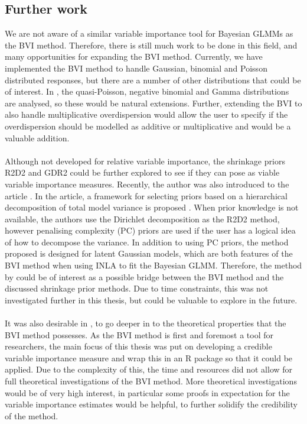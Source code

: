 \subsection*{Further work}
We are not aware of a similar variable importance tool for Bayesian GLMMs as the BVI method. Therefore, there is still much work to be done in this field, and many opportunities for expanding the BVI method. Currently, we have implemented the BVI method to handle Gaussian, binomial and Poisson distributed responses, but there are a number of other distributions that could be of interest. In \citet{nakagawa2017}, the quasi-Poisson, negative binomial and Gamma distributions are analysed, so these would be natural extensions. Further, extending the BVI to also handle multiplicative overdispersion would allow the user to specify if the overdispersion should be modelled as additive or multiplicative and would be a valuable addition.
\\
\\
Although not developed for relative variable importance, the shrinkage priors R2D2 and GDR2 could be further explored to see if they can pose as viable variable importance measures. Recently, the author was also introduced to the article \citet{Fuglstad2020_joint_priors}. In the article, a framework for selecting priors based on a hierarchical decomposition of total model variance is proposed \citep{Fuglstad2020_joint_priors}. When prior knowledge is not available, the authors use the Dirichlet decomposition as the R2D2 method, however penalising complexity (PC) priors are used if the user has a logical idea of how to decompose the variance. In addition to using PC priors, the method proposed is designed for latent Gaussian models, which are both features of the BVI method when using INLA to fit the Bayesian GLMM. Therefore, the method by \citet{Fuglstad2020_joint_priors} could be of interest as a possible bridge between the BVI method and the discussed shrinkage prior methods. Due to time constraints, this was not investigated further in this thesis, but could be valuable to explore in the future.
\\
\\
It was also desirable in \citet{Arnstad:Relative_variable_importance_in_Bayesian_linear_mixed_models:2024}, to go deeper in to the theoretical properties that the BVI method possesses. As the BVI method is first and foremost a tool for researchers, the main focus of this thesis was put on developing a credible variable importance measure and wrap this in an R package so that it could be applied. Due to the complexity of this, the time and resources did not allow for full theoretical investigations of the BVI method. More theoretical investigations would be of very high interest, in particular some proofs in expectation for the variable importance estimates would be helpful, to further solidify the credibility of the method. 
